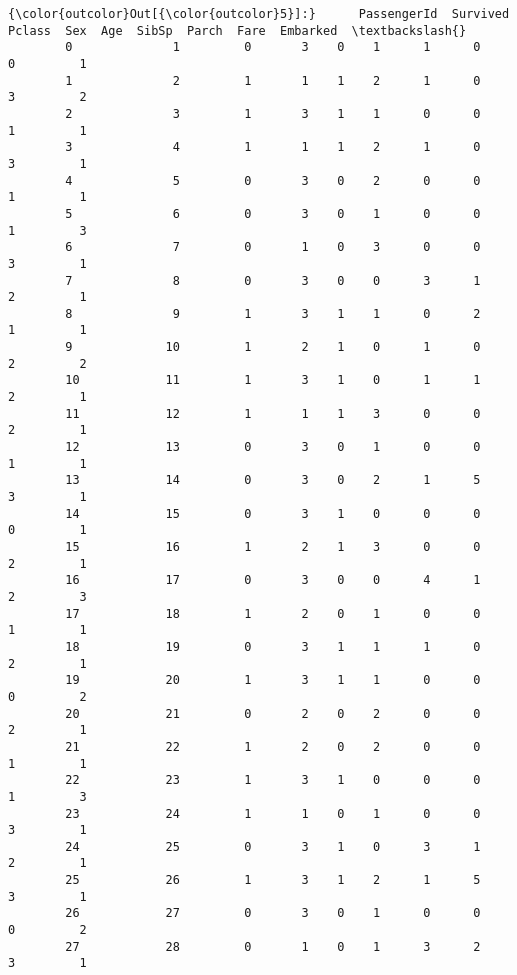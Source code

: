 \documentclass[11pt]{article}
\begin{document}
\begin{Verbatim}[commandchars=\\\{\}]
{\color{outcolor}Out[{\color{outcolor}5}]:}      PassengerId  Survived  Pclass  Sex  Age  SibSp  Parch  Fare  Embarked  \textbackslash{}
        0              1         0       3    0    1      1      0     0         1   
        1              2         1       1    1    2      1      0     3         2   
        2              3         1       3    1    1      0      0     1         1   
        3              4         1       1    1    2      1      0     3         1   
        4              5         0       3    0    2      0      0     1         1   
        5              6         0       3    0    1      0      0     1         3   
        6              7         0       1    0    3      0      0     3         1   
        7              8         0       3    0    0      3      1     2         1   
        8              9         1       3    1    1      0      2     1         1   
        9             10         1       2    1    0      1      0     2         2   
        10            11         1       3    1    0      1      1     2         1   
        11            12         1       1    1    3      0      0     2         1   
        12            13         0       3    0    1      0      0     1         1   
        13            14         0       3    0    2      1      5     3         1   
        14            15         0       3    1    0      0      0     0         1   
        15            16         1       2    1    3      0      0     2         1   
        16            17         0       3    0    0      4      1     2         3   
        17            18         1       2    0    1      0      0     1         1   
        18            19         0       3    1    1      1      0     2         1   
        19            20         1       3    1    1      0      0     0         2   
        20            21         0       2    0    2      0      0     2         1   
        21            22         1       2    0    2      0      0     1         1   
        22            23         1       3    1    0      0      0     1         3   
        23            24         1       1    0    1      0      0     3         1   
        24            25         0       3    1    0      3      1     2         1   
        25            26         1       3    1    2      1      5     3         1   
        26            27         0       3    0    1      0      0     0         2   
        27            28         0       1    0    1      3      2     3         1   

\end{Verbatim}
\end{document}
